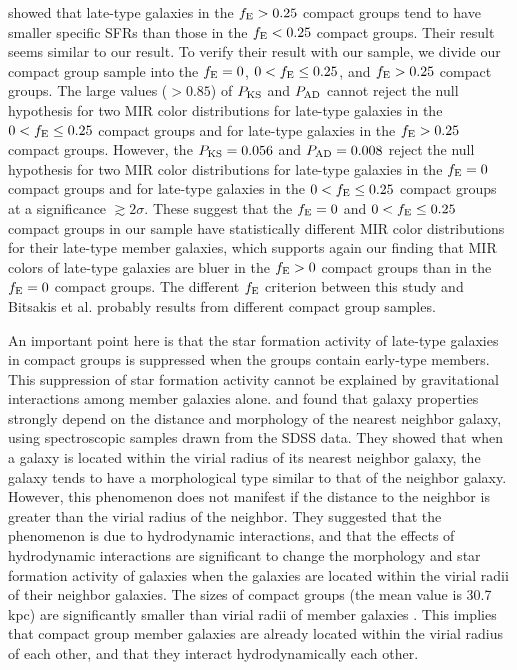 \documentclass[12pt,preprint,apj]{emulateapj}
\newcommand{\efrac}{f_{\rm E}}
\begin{document}
\citet{bitsakis+10,bitsakis+11} showed that late-type galaxies in the $\efrac>0.25$ 
compact groups tend to have smaller specific SFRs than those in the $\efrac<0.25$ 
compact groups. Their result seems similar to our result. To verify their result 
with our sample, we divide our compact group sample into the $\efrac=0$, 
$0<\efrac\leq0.25$, and $\efrac>0.25$ compact groups. 
The large values ($>0.85$) of $P_{\rm KS}$ and $P_{\rm AD}$ cannot reject 
the null hypothesis for two MIR color distributions for late-type galaxies 
in the $0<\efrac\leq0.25$ compact groups and for late-type galaxies 
in the $\efrac>0.25$ compact groups.
However, the $P_{\rm KS}=0.056$ and $P_{\rm AD}=0.008$ reject the null hypothesis 
for two MIR color distributions for late-type galaxies in the $\efrac=0$ compact groups
and for late-type galaxies in the $0<\efrac\leq0.25$ compact groups 
at a significance $\gtrsim2\sigma$. 
These suggest that the $\efrac=0$ and $0<\efrac\leq0.25$ compact groups in 
our sample have statistically different MIR color distributions for
their late-type member galaxies, which supports again our finding that MIR colors 
of late-type galaxies are bluer in the $\efrac>0$ compact groups than 
in the $\efrac=0$ compact groups. The different $\efrac$ criterion 
between this study and Bitsakis et al. 
probably results from different compact group samples.

An important point here is that the star formation activity of late-type galaxies 
in compact groups is suppressed when the groups contain early-type members. 
This suppression of star formation activity cannot be explained by gravitational 
interactions among member galaxies alone. 
\citet{park+08} and \citet{pnc09} found that galaxy properties strongly depend on 
the distance and morphology of the nearest neighbor galaxy, using 
spectroscopic samples drawn from the SDSS data. They showed that 
when a galaxy is located within the virial radius of its nearest neighbor galaxy, 
the galaxy tends to have a morphological type similar to that of the neighbor galaxy. 
However, this phenomenon does not manifest 
if the distance to the neighbor is greater than the virial radius of the neighbor. 
They suggested that the phenomenon is due to hydrodynamic 
interactions, and that the effects of hydrodynamic interactions are significant to change the morphology and 
star formation activity of galaxies when the galaxies are located within the virial 
radii of their neighbor galaxies. 
The sizes of compact groups (the mean value is 30.7 kpc) are significantly
smaller than virial radii of member galaxies \citep[i.e., 430 kpc and 340 kpc 
for early- and late-type galaxies with $M_r=-20.77$,][]{park+09}. 
This implies that compact group member galaxies are already located 
within the virial radius of each other, and that they interact hydrodynamically 
each other.
\end{document}
